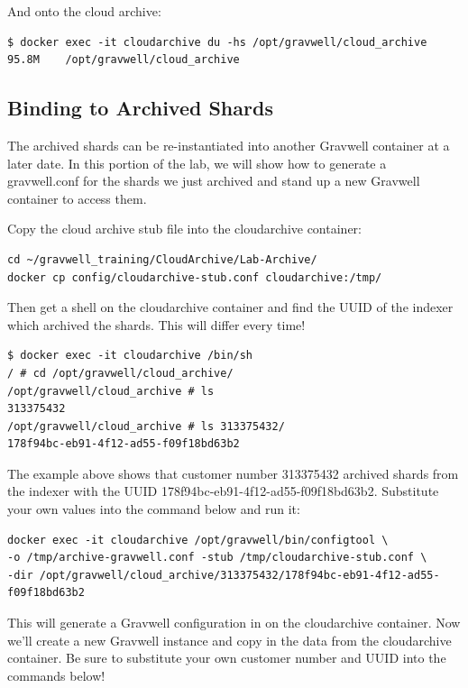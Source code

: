 And onto the cloud archive:

\begin{Verbatim}[breaklines=true]
$ docker exec -it cloudarchive du -hs /opt/gravwell/cloud_archive
95.8M    /opt/gravwell/cloud_archive
\end{Verbatim}

\subsection{Binding to Archived Shards}

The archived shards can be re-instantiated into another Gravwell
container at a later date. In this portion of the lab, we will show how
to generate a gravwell.conf for the shards we just archived and stand up
a new Gravwell container to access them.

Copy the cloud archive stub file into the cloudarchive container:

\begin{Verbatim}[breaklines=true]
cd ~/gravwell_training/CloudArchive/Lab-Archive/
docker cp config/cloudarchive-stub.conf cloudarchive:/tmp/
\end{Verbatim}

Then get a shell on the cloudarchive container and find the UUID of
the indexer which archived the shards. This will differ every time!

\begin{Verbatim}[breaklines=true]
$ docker exec -it cloudarchive /bin/sh
/ # cd /opt/gravwell/cloud_archive/
/opt/gravwell/cloud_archive # ls
313375432
/opt/gravwell/cloud_archive # ls 313375432/
178f94bc-eb91-4f12-ad55-f09f18bd63b2
\end{Verbatim}

The example above shows that customer number 313375432 archived
shards from the indexer with the UUID
178f94bc-eb91-4f12-ad55-f09f18bd63b2. Substitute your own values
into the command below and run it:

\begin{Verbatim}[breaklines=true]
docker exec -it cloudarchive /opt/gravwell/bin/configtool \
-o /tmp/archive-gravwell.conf -stub /tmp/cloudarchive-stub.conf \
-dir /opt/gravwell/cloud_archive/313375432/178f94bc-eb91-4f12-ad55-f09f18bd63b2
\end{Verbatim}

This will generate a Gravwell configuration in
 on the cloudarchive container. Now we'll
create a new Gravwell instance and copy in the data from the
cloudarchive container. Be sure to substitute your own customer
number and UUID into the commands below!

